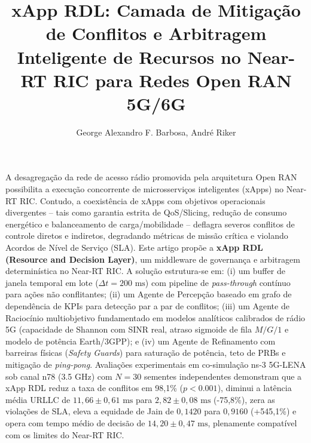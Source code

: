 \documentclass[12pt]{article}
\title{xApp RDL: Camada de Mitigação de Conflitos e Arbitragem Inteligente de Recursos no Near-RT RIC para Redes Open RAN 5G/6G}
\author{George Alexandro F. Barbosa\inst{1}, André Riker\inst{1}}
\begin{document}
\maketitle

\begin{resumo}
A desagregação da rede de acesso rádio promovida pela arquitetura Open RAN possibilita a execução concorrente de microsserviços inteligentes (xApps) no Near-RT RIC. Contudo, a coexistência de xApps com objetivos operacionais divergentes -- tais como garantia estrita de QoS/Slicing, redução de consumo energético e balanceamento de carga/mobilidade -- deflagra severos conflitos de controle diretos e indiretos, degradando métricas de missão crítica e violando Acordos de Nível de Serviço (SLA). Este artigo propõe a \textbf{xApp RDL (Resource and Decision Layer)}, um middleware de governança e arbitragem determinística no Near-RT RIC. A solução estrutura-se em: (i) um buffer de janela temporal em lote ($\Delta t = 200\text{ ms}$) com pipeline de \textit{pass-through} contínuo para ações não conflitantes; (ii) um Agente de Percepção baseado em grafo de dependência de KPIs para detecção par a par de conflitos; (iii) um Agente de Raciocínio multiobjetivo fundamentado em modelos analíticos calibrados de rádio 5G (capacidade de Shannon com SINR real, atraso sigmoide de fila $M/G/1$ e modelo de potência Earth/3GPP); e (iv) um Agente de Refinamento com barreiras físicas (\textit{Safety Guards}) para saturação de potência, teto de PRBs e mitigação de \textit{ping-pong}. Avaliações experimentais em co-simulação ns-3 5G-LENA sob canal n78 (3.5 GHz) com $N = 30$ sementes independentes demonstram que a xApp RDL reduz a taxa de conflitos em 98,1\% ($p < 0.001$), diminui a latência média URLLC de $11,66 \pm 0,61\text{ ms}$ para $2,82 \pm 0,08\text{ ms}$ (-75,8\%), zera as violações de SLA, eleva a equidade de Jain de $0,1420$ para $0,9160$ (+545,1\%) e opera com tempo médio de decisão de $14,20 \pm 0,47\text{ ms}$, plenamente compatível com os limites do Near-RT RIC.
\end{resumo}
\end{document}
